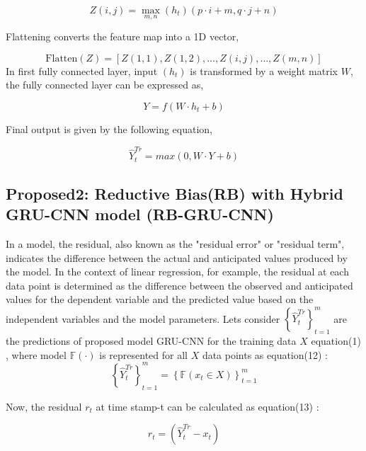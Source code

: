 \begin{equation}
  Z(i,  j) = \max_{m,  n} (h_t)(p \cdot i + m,  q \cdot j + n)
  \end{equation}

Flattening converts the feature map into a 1D vector, 

  \begin{equation}
  \text{Flatten}(Z) = [Z(1,  1),  Z(1,  2),  \ldots,  Z(i,  j),  \ldots,  Z(m,  n)]
  \end{equation}
In first fully connected layer,  input $(h_t)$ is transformed by a weight matrix \(W\),  the fully connected layer can be expressed as, 

\begin{equation}
  Y = f(W\cdot h_t + b)
\end{equation}

Final output is given by the following equation, 

   
\begin{equation}
   \hat Y_{t}^{Tr} = max(0  ,   W \cdot Y + b)
\end{equation}

\subsection{Proposed2: Reductive Bias(RB) with Hybrid GRU-CNN model (RB-GRU-CNN)}


In a model,  the residual,  also known as the "residual error" or "residual term",  indicates the difference between the actual and anticipated values produced by the model. In the context of linear regression,  for example,  the residual at each data point is determined as the difference between the observed and anticipated values for the dependent variable and the predicted value based on the independent variables and the model parameters. Lets consider $ \left \{ \hat Y_{t}^{Tr} \right \}_{t=1}^m$ are the predictions of proposed model GRU-CNN for the training data $X$ equation(1) ,  where model $\mathbb{F}(\cdot)$ is represented for all $X$ data points as equation(12) :
\begin{equation}
 \left \{ \hat Y_{t}^{Tr} \right \}_{t=1}^m =  \left \{ \mathbb{F} (x_{t}\in X) \right \}_{t=1}^m
\end{equation}

Now,  the residual $r_{t}$ at time stamp-t can be calculated as equation(13) :

\begin{equation}
    r_{t} = (\hat Y_{t}^{Tr}- x_{t})
\end{equation}


